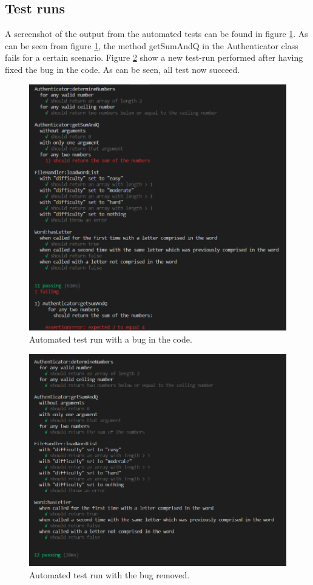\documentclass[12pt, letterpaper]{article}
\begin{document}
\subsection{Test runs}
 A screenshot of the output from the automated tests can be found in figure \ref{fig:automatedTest1}. As can be seen from figure \ref{fig:automatedTest1}, the method getSumAndQ in the Authenticator class fails for a certain scenario. Figure \ref{fig:automatedTest2} show a new test-run performed after having fixed the bug in the code. As can be seen, all test now succeed. 
\newline
\begin{figure}[H]\label{fig:automatedTest1}
	\includegraphics{automatedTest1}
	\caption{Automated test run with a bug in the code.}
	\centering
\end{figure}
\begin{figure}[H]\label{fig:automatedTest2}
	\includegraphics{automatedTest2}
	\caption{Automated test run with the bug removed.}
	\centering
\end{figure}
\end{document}
